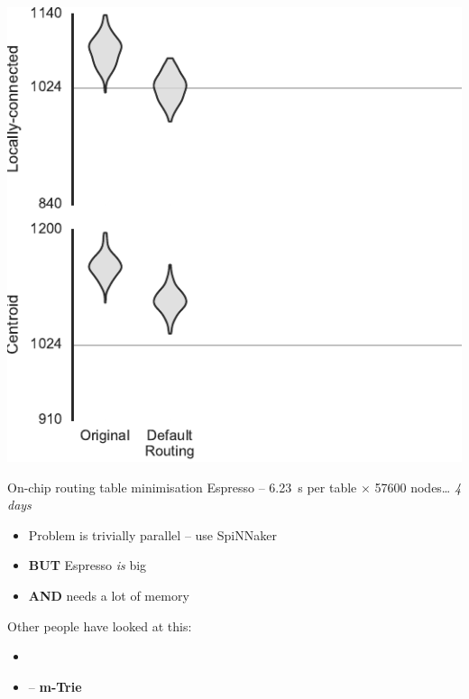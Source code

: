 \documentclass[t]{beamer}
\begin{document}
\begin{frame}[plain]{}
  \begin{center}
    \includegraphics[page=3]{../experiments/presentation_plots}
  \end{center}
\end{frame}

\begin{frame}{On-chip routing table minimisation}  %
  Espresso -- \SI{6.23}{\second} per table
  \pause $\times$ \num{57600} nodes\ldots
  \pause \emph{4 days}

  \begin{itemize}
    \item Problem is trivially parallel -- use SpiNNaker
    \item \textbf{BUT} Espresso \emph{is} big
    \item \textbf{AND} needs a lot of memory
  \end{itemize}

  Other people have looked at this:

  \begin{itemize}
    \item {}
    \item {} -- \textbf{m-Trie}
  \end{itemize}
\end{frame}
\end{document}
